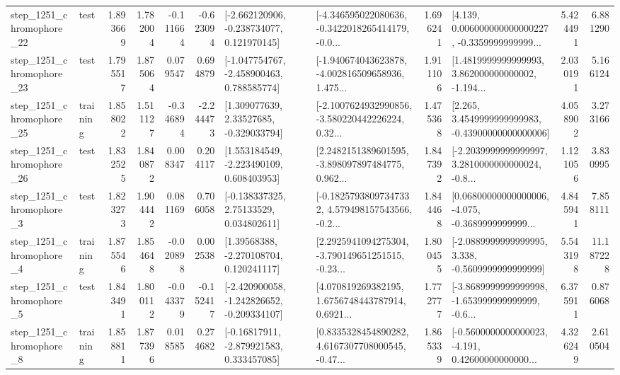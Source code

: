 \begin{tabular}{llrrrrllrlrr}
 step\_1251\_chromophore\_22 &      test &      1.893669 &    1.782004 &     -0.111664 & -0.623094 &   [-2.662120906, -0.238734077, 0.121970145] &  [-4.346595022080636, -0.3422018265414179, -0.0... &       1.696241 &  [4.139, 0.006000000000000227, -0.3359999999999... &            5.424491 &          6.881290 \\
 step\_1251\_chromophore\_23 &      test &      1.795517 &    1.875064 &      0.079547 &  0.694879 &   [-1.047754767, -2.458900463, 0.788585774] &  [-1.940674043623878, -4.002816509658936, 1.475... &       1.911106 &  [1.4819999999999993, 3.862000000000002, -1.194... &            2.030191 &          5.166124 \\
 step\_1251\_chromophore\_25 &  training &      1.858022 &    1.511127 &     -0.346894 & -2.244473 &     [1.309077639, 2.33527685, -0.329033794] &  [-2.1007624932990856, -3.580220442226224, 0.32... &       1.475368 &  [2.265, 3.4549999999999983, -0.43900000000000006] &            4.058902 &          3.273166 \\
 step\_1251\_chromophore\_26 &      test &      1.832525 &    1.840872 &      0.008347 &  0.204117 &    [1.553184549, -2.223490109, 0.608403953] &  [2.2482151389601595, -3.898097897484775, 0.962... &       1.847392 &  [-2.2039999999999997, 3.2810000000000024, -0.8... &            1.121056 &          3.830995 \\
  step\_1251\_chromophore\_3 &      test &      1.823273 &    1.904442 &      0.081169 &  0.706058 &     [-0.138337325, 2.75133529, 0.034802611] &  [-0.18257938097347332, 4.579498157543566, -0.2... &       1.844468 &  [0.06800000000000006, -4.075, -0.3689999999999... &            4.845941 &          7.858111 \\
  step\_1251\_chromophore\_4 &  training &      1.875546 &    1.854648 &     -0.020898 &  0.002538 &     [1.39568388, -2.270108704, 0.120241117] &  [2.2925941094275304, -3.790149651251515, -0.23... &       1.800455 &  [-2.0889999999999995, 3.338, -0.5609999999999999] &            5.543198 &         11.187228 \\
  step\_1251\_chromophore\_5 &      test &      1.843491 &    1.800112 &     -0.043379 & -0.152417 &  [-2.420900058, -1.242826652, -0.209334107] &  [4.070819269382195, 1.6756748443787914, 0.6921... &       1.772777 &  [-3.8689999999999998, -1.653999999999999, -0.6... &            6.375911 &          0.876068 \\
  step\_1251\_chromophore\_8 &  training &      1.858811 &    1.877396 &      0.018585 &  0.274682 &    [-0.16817911, -2.879921583, 0.333457085] &  [0.8335328454890282, 4.6167307708000545, -0.47... &       1.865339 &  [-0.5600000000000023, -4.191, 0.42600000000000... &            4.326249 &          2.610504 \\

\end{tabular}
